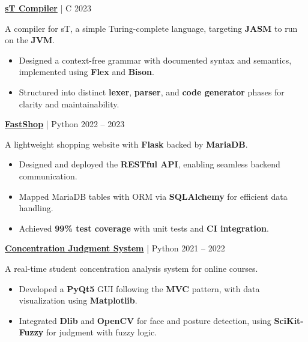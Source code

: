 \documentclass[11pt]{article}
\begin{document}
\vspace{6pt}

\textbf{\href{https://github.com/Lai-YT/st-lang}{sT Compiler}} | C \hfill 2023

A compiler for sT, a simple Turing-complete language, targeting \textbf{JASM} to run on the \textbf{JVM}.
\begin{itemize}[noitemsep, topsep=0pt, partopsep=0pt, parsep=0pt, leftmargin=*]
    \item Designed a context-free grammar with documented syntax and semantics, implemented using \textbf{Flex} and \textbf{Bison}.
    \item Structured into distinct \textbf{lexer}, \textbf{parser}, and \textbf{code generator} phases for clarity and maintainability.
\end{itemize}

\vspace{6pt}

\textbf{\href{https://github.com/ntut-xuan/FastShop}{FastShop}} | Python \hfill 2022 -- 2023

A lightweight shopping website with \textbf{Flask} backed by \textbf{MariaDB}.
\begin{itemize}[noitemsep, topsep=0pt, partopsep=0pt, parsep=0pt, leftmargin=*]
    \item Designed and deployed the \textbf{RESTful  API}, enabling seamless backend communication.
    \item Mapped MariaDB tables with ORM via \textbf{SQLAlchemy} for efficient data handling.
    \item Achieved \textbf{99\% test coverage} with unit tests and \textbf{CI integration}.
\end{itemize}

\vspace{6pt}

\textbf{\href{https://github.com/Lai-YT/webcam-applications}{Concentration Judgment System}} | Python \hfill 2021 -- 2022

A real-time student concentration analysis system for online courses.
\begin{itemize}[noitemsep, topsep=0pt, partopsep=0pt, parsep=0pt, leftmargin=*]
    \item Developed a \textbf{PyQt5} GUI following the \textbf{MVC} pattern, with data visualization using \textbf{Matplotlib}.
    \item Integrated \textbf{Dlib} and \textbf{OpenCV} for face and posture detection, using \textbf{SciKit-Fuzzy} for judgment with fuzzy logic.
\end{itemize}
\end{document}
